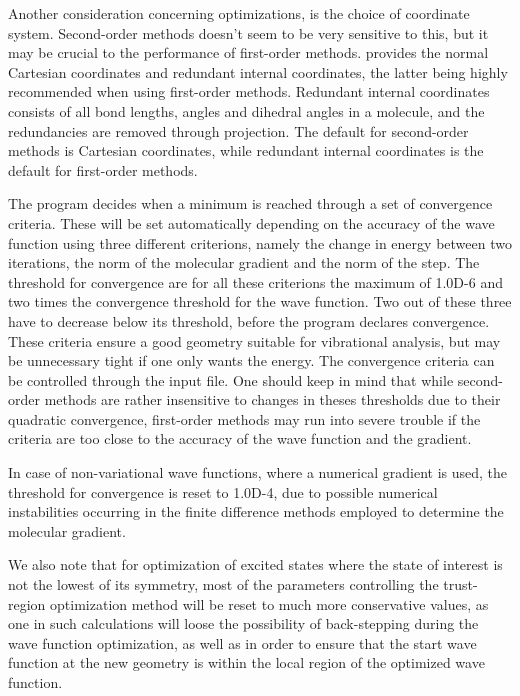 Another consideration concerning optimizations, is the choice of
coordinate system. Second-order methods doesn't seem to be very
sensitive to this, but it may be crucial to the performance of
first-order methods. {\siraba} provides the normal Cartesian
coordinates and redundant internal
coordinates, the latter being
highly recommended when using first-order methods. Redundant internal
coordinates consists of all bond lengths, angles and dihedral angles
in a molecule, and the redundancies are removed through
projection. The default for second-order methods is Cartesian
coordinates, while redundant internal coordinates is the default for
first-order methods.

The program decides when a minimum is reached through a set of
convergence criteria. These will be
set automatically depending on the accuracy of the wave function
using three different criterions, namely the change in energy
between two iterations, the norm of the molecular
gradient and the norm of the
step. The threshold for convergence are for all
these criterions the maximum of 1.0D-6 and two times the
convergence threshold for the wave function. Two out of these
three have to decrease below its threshold, before the program
declares convergence. These criteria ensure a good geometry
suitable for vibrational analysis, but may be unnecessary tight if
one only wants the energy. The convergence criteria can be
controlled through the input file. One should keep in mind that
while second-order methods are rather insensitive to changes in
theses thresholds due to their quadratic convergence, first-order
methods may run into severe trouble if the criteria are too close
to the accuracy of the wave function and the gradient.

In case of non-variational
wave functions, where a numerical gradient is used, the threshold for convergence is reset to
1.0D-4, due to possible numerical instabilities occurring in the
finite difference methods employed to
determine the molecular gradient.

We also note that for optimization of excited states where the state of interest is not the lowest of its
symmetry, most of the parameters controlling the trust-region
optimization method will be reset to much more conservative
values, as one in such calculations will loose the possibility of
back-stepping during the wave function optimization, as well as in
order to ensure that the start wave function at the new geometry
is within the local region of the optimized wave function.

